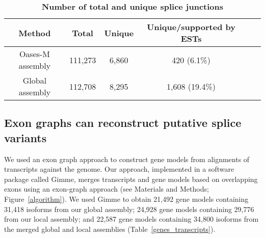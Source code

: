 \begin{table}
\caption{
\textbf{Number of total and unique splice junctions}}
\begin{center}
\begin{tabular}{cccccc}
\hline
Method& Total & Unique & Unique/supported by ESTs \\ 
\hline
Oases-M assembly & 111,273 & 6,860 & 420 (6.1\%) \\
Global assembly & 112,708 & 8,295 & 1,608 (19.4\%) \\
\hline
\end{tabular}
\label{Oases-M}
\end{center}
\end{table}




\subsection{Exon graphs can reconstruct putative splice variants}

We used an exon graph approach to construct gene models from
alignments of transcripts against the genome.  Our approach,
implemented in a software package called Gimme, merges transcripts and
gene models based on overlapping exons using an exon-graph approach
(see Materials and Methods; Figure~\ref{algorithm}).  We used Gimme to obtain
21,492 gene models containing 31,418 isoforms from our global
assembly; 24,928 gene models containing 29,776 from our local
assembly; and 22,587 gene models containing 34,800 isoforms from the
merged global and local assemblies (Table~\ref{genes_transcripts}).

